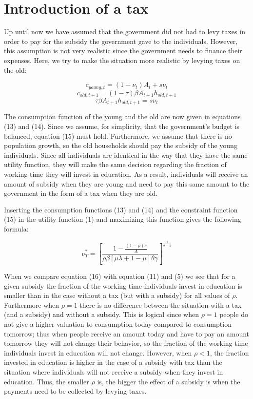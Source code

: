\documentclass[a4paper,11pt]{article} %
\begin{document}
\section{Introduction of a tax}
Up until now we have assumed that the government did not had to levy taxes in order to pay for the subsidy the government gave to the individuals. However, this assumption is not very realistic since the government needs to finance their expenses. Here, we try to make the situation more realistic by levying taxes on the old: 

\begin{equation}
  c_{young,t}= \left( 1-\nu_t \right)A_t+s\nu_t
\end{equation}
\begin{equation}
  c_{old,t+1}= \left( 1- \tau \right) \beta A_{t+1}h_{old,t+1}
\end{equation}
\begin{equation}
  \tau\beta A_{t+1}h_{old,t+1} = s\nu_t
\end{equation}

The consumption function of the young and the old are now given in equations (13) and (14). Since we assume, for simplicity, that the government's budget is balanced, equation (15) must hold. Furthermore, we assume that there is no population growth, so the old households should pay the subsidy of the young individuals. Since all individuals are identical in the way that they have the same utility function, they will make the same decision regarding the fraction of working time they will invest in education. As a result, individuals will receive an amount of subsidy when they are young and need to pay this same amount to the government in the form of a tax when they are old. 

Inserting the consumption functions (13) and (14) and the constraint function (15) in the utility function (1) and maximizing this function gives the following formula:

\begin{equation}
  \nu^*_T = \left[ \frac{1- \frac{ \left(1-\rho\right)s}{A}}
    {\rho\beta \left[\mu\lambda+1-\mu\right] \theta\gamma} \right]
  ^{ \frac{1}{\theta-1}}
\end{equation}

When we compare equation (16) with equation (11) and (5) we see that for a given subsidy the fraction of the working time individuals invest in education is smaller than in the case without a tax (but with a subsidy) for all values of \(\rho\). Furthermore when \(\rho=1\) there is no difference between the situation with a tax (and a subsidy) and without a subsidy. This is logical since when \(\rho=1\) people do not give a higher valuation to consumption today compared to consumption tomorrow; thus when people receive an amount today and have to pay an amount tomorrow they will not change their behavior, so the fraction of the working time individuals invest in education will not change. However, when \(\rho<1\), the fraction invested in education is higher in the case of a subsidy with tax than the situation where individuals will not receive a subsidy when they invest in education. Thus, the smaller \(\rho\) is, the bigger the effect of a subsidy is when the payments need to be collected by levying taxes. 
\end{document}
